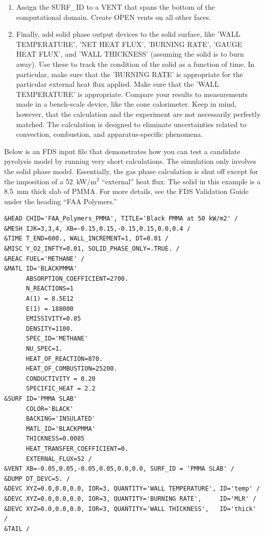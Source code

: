 \documentclass[11pt]{book}
\begin{document}
\begin{enumerate}
\item Assign the {\ct SURF\_ID} to a {\ct VENT} that spans the bottom of the computational domain. Create {\ct OPEN} vents on all other faces.
\item Finally, add solid phase output devices to the solid surface, like {\ct 'WALL TEMPERATURE'}, {\ct 'NET HEAT FLUX'}, {\ct 'BURNING RATE'}, {\ct 'GAUGE HEAT FLUX'}, and {\ct 'WALL THICKNESS'} (assuming the solid is to burn away). Use these to track the condition of the solid as a function of time. In particular, make sure that the {\ct 'BURNING RATE'} is appropriate for the particular external heat flux applied. Make sure that the {\ct 'WALL TEMPERATURE'} is appropriate. Compare your results to measurements made in a bench-scale device, like the cone calorimeter. Keep in mind, however, that the calculation and the experiment are not necessarily perfectly matched. The calculation is designed to eliminate uncertainties related to convection, combustion, and apparatus-specific phenomena.
\end{enumerate}
Below is an FDS input file that demonstrates how you can test a candidate pyrolysis model by running very short calculations. The simulation only involves the solid phase model. Essentially, the gas phase calculation is shut off except for the imposition of a 52~kW/m$^2$ ``external'' heat flux. The solid in this example is a 8.5~mm thick slab of PMMA. For more details, see the FDS Validation Guide under the heading ``FAA Polymers.''

\begin{lstlisting}
&HEAD CHID='FAA_Polymers_PMMA', TITLE='Black PMMA at 50 kW/m2' /
&MESH IJK=3,3,4, XB=-0.15,0.15,-0.15,0.15,0.0,0.4 /
&TIME T_END=600., WALL_INCREMENT=1, DT=0.01 /
&MISC Y_O2_INFTY=0.01, SOLID_PHASE_ONLY=.TRUE. /
&REAC FUEL='METHANE' /
&MATL ID='BLACKPMMA'
      ABSORPTION_COEFFICIENT=2700.
      N_REACTIONS=1
      A(1) = 8.5E12
      E(1) = 188000
      EMISSIVITY=0.85
      DENSITY=1100.
      SPEC_ID='METHANE'
      NU_SPEC=1.
      HEAT_OF_REACTION=870.
      HEAT_OF_COMBUSTION=25200.
      CONDUCTIVITY = 0.20
      SPECIFIC_HEAT = 2.2
&SURF ID='PMMA SLAB'
      COLOR='BLACK'
      BACKING='INSULATED'
      MATL_ID='BLACKPMMA'
      THICKNESS=0.0085
      HEAT_TRANSFER_COEFFICIENT=0.
      EXTERNAL_FLUX=52 /
&VENT XB=-0.05,0.05,-0.05,0.05,0.0,0.0, SURF_ID = 'PMMA SLAB' /
&DUMP DT_DEVC=5. /
&DEVC XYZ=0.0,0.0,0.0, IOR=3, QUANTITY='WALL TEMPERATURE', ID='temp' /
&DEVC XYZ=0.0,0.0,0.0, IOR=3, QUANTITY='BURNING RATE',     ID='MLR' /
&DEVC XYZ=0.0,0.0,0.0, IOR=3, QUANTITY='WALL THICKNESS',   ID='thick' /
&TAIL /
\end{lstlisting}
\end{document}
